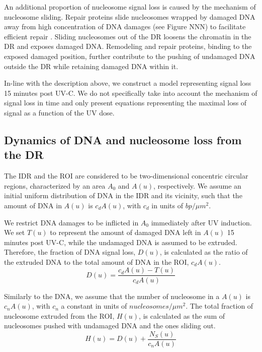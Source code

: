 \documentclass[12pt]{article}
\begin{document}
	An additional proportion of nucleosome signal loss is caused by the mechanism of nucleosome sliding. Repair proteins slide nucleosomes wrapped by damaged DNA away from high concentration of DNA damages (see Figure NNN) to facilitate efficient repair \cite{gaillard2003chromatin}. Sliding nucleosomes out of the DR loosens the chromatin in the DR and exposes damaged DNA. Remodeling and repair proteins, binding to the exposed damaged position, further contribute to the pushing of undamaged DNA outside the DR while retaining damaged DNA within it.  

    In-line with the description above, we construct a model representing
	signal loss 15 minutes post UV-C. We do not specifically take into account the
	mechanism of signal loss in time and only present equations representing the maximal loss of signal as a function of the UV dose.
	
	\subsection{Dynamics of DNA and nucleosome loss from the DR}
	The IDR and the ROI are considered to be two-dimensional concentric circular regions, characterized by an area $A_0$ and $A(u)$, respectively. We assume an initial uniform distribution of DNA in the IDR and its vicinity, such that the amount of DNA in $A(u)$ is $c_dA(u)$, with $c_d$ in units of $bp/\mu m^2$. 
	
	We restrict DNA damages to be inflicted in $A_0$ immediately after UV induction. We set $T(u)$ to represent the amount of damaged DNA left in $A(u)$ 15 minutes post UV-C, while the undamaged DNA is assumed to be extruded. Therefore, the fraction of DNA signal loss, $D(u)$, is calculated as the ratio of the extruded DNA to the total amount of DNA in the ROI, $c_dA(u)$. 
	\begin{equation}\label{eq:DNALossFraction}
	D(u) = \frac{c_dA(u)- T(u)}{c_dA(u)}
	\end{equation}
	
	Similarly to the DNA, we assume that the number of nucleosome in a $A(u)$ is $c_nA(u)$, with $c_n$ a constant in units of $nucleosomes/\mu m^2$. The total fraction of nucleosome extruded from the ROI, $H(u)$, is calculated as the sum of nucleosomes pushed with undamaged DNA and the ones sliding out.
	\begin{equation}\label{eq:nucleosomeLossFraction}
	H(u) = D(u) + \frac{N_S(u)}{c_nA(u)}	
	\end{equation}
	
\end{document}
